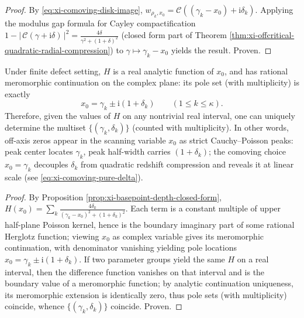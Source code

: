 \begin{proof}
By \eqref{eq:xi-comoving-disk-image}, \(w_{\rho_k,x_0}=\mathcal{C}((\gamma_k-x_0)+\mathrm{i}\delta_k)\).
Applying the modulus gap formula for Cayley compactification \(1-|\,\mathcal{C}(\gamma+\mathrm{i}\delta)\,|^2=\frac{4\delta}{\gamma^2+(1+\delta)^2}\) (closed form part of Theorem \ref{thm:xi-offcritical-quadratic-radial-compression}) to \(\gamma\mapsto \gamma_k-x_0\) yields the result. Proven.
\end{proof}
\begin{theorem}\label{thm:xi-basepoint-scan-inversion-uniqueness}
Under finite defect setting, \(H\) is a real analytic function of \(x_0\), and has rational meromorphic continuation on the complex plane:
its pole set (with multiplicity) is exactly
\[
x_0=\gamma_k\pm \mathrm{i}(1+\delta_k)\qquad(1\le k\le\kappa).
\]
Therefore, given the values of \(H\) on any nontrivial real interval, one can uniquely determine the multiset \(\{(\gamma_k,\delta_k)\}\) (counted with multiplicity).
In other words, off-axis zeros appear in the scanning variable \(x_0\) as strict Cauchy--Poisson peaks: peak center locates \(\gamma_k\), peak half-width carries \((1+\delta_k)\); the comoving choice \(x_0=\gamma_k\) decouples \(\delta_k\) from quadratic redshift compression and reveals it at linear scale (see \eqref{eq:xi-comoving-pure-delta}).
\end{theorem}
\begin{proof}
By Proposition \ref{prop:xi-basepoint-depth-closed-form},
\(
H(x_0)=\sum_k \frac{4\delta_k}{(\gamma_k-x_0)^2+(1+\delta_k)^2}
\).
Each term is a constant multiple of upper half-plane Poisson kernel, hence is the boundary imaginary part of some rational Herglotz function; viewing \(x_0\) as complex variable gives its meromorphic continuation, with denominator vanishing yielding pole locations \(x_0=\gamma_k\pm \mathrm{i}(1+\delta_k)\).
If two parameter groups yield the same \(H\) on a real interval, then the difference function vanishes on that interval and is the boundary value of a meromorphic function; by analytic continuation uniqueness, its meromorphic extension is identically zero, thus pole sets (with multiplicity) coincide, whence \(\{(\gamma_k,\delta_k)\}\) coincide. Proven.
\end{proof}
